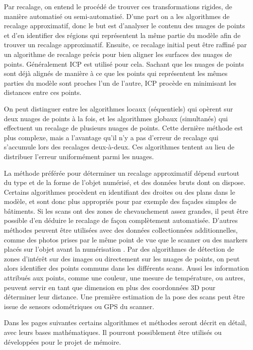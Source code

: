 \documentclass[a4paper,10pt]{scrreprt}
\begin{document}
Par recalage, on entend le procédé de trouver ces transformations rigides, de manière automatisé ou semi-automatisé. D'une part on a les algorithmes de recalage approximatif, donc le but est d'analyser le contenu des nuages de points et d'en identifier des régions qui représentent la même partie du modèle afin de trouver un recalage approximatif. Ensuite, ce recalage initial peut être raffiné par un algorithme de recalage précis pour bien aligner les surfaces des nuages de points. Généralement ICP est utilisé pour cela. Sachant que les nuages de points sont déjà alignés de manière à ce que les points qui représentent les mêmes parties du modèle sont proches l'un de l'autre, ICP procède en minimisant les distances entre ces points.

On peut distinguer entre les algorithmes locaux (séquentiels) qui opèrent sur deux nuages de points à la fois, et les algorithmes globaux (simultanés) qui effectuent un recalage de plusieurs nuages de points. Cette dernière méthode est plus complexe, mais a l'avantage qu'il n'y a pas d'erreur de recalage qui s'accumule lors des recalages deux-à-deux. Ces algorithmes tentent au lieu de distribuer l'erreur uniformément parmi les nuages.

La méthode préférée pour déterminer un recalage approximatif dépend surtout du type et de la forme de l'objet numérisé, et des données bruts dont on dispose. Certains algorithmes procèdent en identifiant des droites \cite{Lich2011} ou des plans \cite{Dold2006} dans le modèle, et sont donc plus appropriés pour par exemple des façades simples de bâtiments. Si les scans ont des zones de chevauchement assez grandes, il peut être possible d'en déduire le recalage de façon complètement automatisée. D'autres méthodes peuvent être utilisées avec des données collectionnées additionnelles, comme des photos prises par le même point de vue que le scanner \cite{Tour2009} ou des markers placés sur l'objet avant la numérisation \cite{Mati2011}. Par des algorithmes de détection de zones d'intérêt \cite{Tuyt2007} sur des images ou directement sur les nuages de points, on peut alors identifier des points communs dans les différents scans. Aussi les information attribués aux points, comme une couleur, une mesure de température, ou autres, peuvent servir en tant que dimension en plus des coordonnées 3D pour déterminer leur distance. Une première estimation de la pose des scans peut être issue de sensors odométriques ou GPS du scanner.

Dans les pages suivantes certains algorithmes et méthodes seront décrit en détail, avec leurs bases mathématiques. Il pourront possiblement être utilisés ou développées pour le projet de mémoire.
\end{document}
